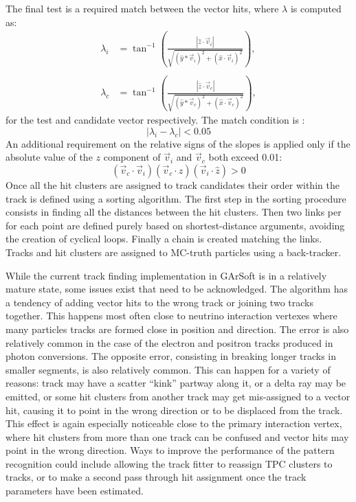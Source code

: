 The final test is a required match between the vector hits, where $\lambda$ is computed as:
\begin{equation}
    \begin{aligned}
        \lambda_i&=\tan^{-1}\left(\frac{|\hat{z}\cdot\Vec{v}_i|}{\sqrt{(\hat{y}*\Vec{v}_i)^2+(\hat{x}\cdot\Vec{v}_i)^2}}\right),\\\\
        \lambda_c&=\tan^{-1}\left(\frac{|\hat{z}\cdot\Vec{v}_c|}{\sqrt{(\hat{y}*\Vec{v}_c)^2+(\hat{x}\cdot\Vec{v}_c)^2}}\right),
    \end{aligned}
\end{equation}
for the test and candidate vector respectively. The match condition is :
\begin{equation}
    |\lambda_i-\lambda_c|<0.05
\end{equation}
An additional requirement on the relative signs of the slopes is applied only if the absolute value of the $z$ component of $\Vec{v}_i$ and $\Vec{v}_c$ both exceed 0.01:
\begin{equation}
    (\Vec{v}_c\cdot\Vec{v}_i)(\Vec{v}_c\cdot\hat{z})(\Vec{v}_i\cdot\hat{z})>0
\end{equation}
Once all the hit clusters are assigned to track candidates their order within the track is defined using a sorting algorithm. The first step in the sorting procedure consists in finding all the distances between the hit clusters. Then two links per for each point are defined purely based on shortest-distance arguments, avoiding the creation of cyclical loops. Finally a chain is created matching the links. Tracks and hit clusters are assigned to MC-truth particles using a back-tracker.

While the current track finding implementation in GArSoft is in a relatively mature state, some issues exist that need to be acknowledged. The algorithm has a tendency of adding vector hits to the wrong track or joining two tracks together. This happens most often close to neutrino interaction vertexes where many particles tracks are formed close in position and direction. The error is also relatively common in the case of the electron and positron tracks produced in photon conversions. The opposite error, consisting in breaking longer tracks in smaller segments, is also relatively common. This can happen for a variety of reasons: track may have a scatter \enquote{kink} partway along it, or a delta ray may be emitted, or some hit clusters from another track may get mis-assigned to a vector hit, causing it to
point in the wrong direction or to be displaced from the track. This effect is again especially noticeable close to the primary interaction vertex, where hit clusters from more than one track can be confused and vector hits may point in the wrong direction. Ways to improve the performance of the pattern recognition could include allowing the track fitter to reassign TPC clusters to tracks, or to make a second pass through hit assignment once the track parameters have been estimated.
